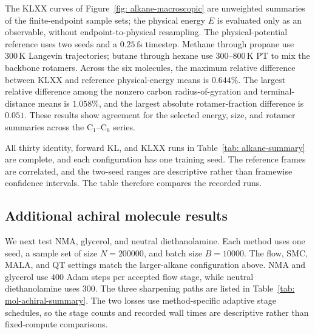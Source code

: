 \documentclass{article}
\begin{document}
The KLXX curves  of Figure~\ref{fig: alkane-macroscopic} are unweighted summaries of the finite-endpoint sample sets; the physical energy $E$ is evaluated only as an observable, without endpoint-to-physical resampling. The physical-potential reference uses two seeds and a $0.25\,\mathrm{fs}$ timestep. Methane through propane use $300\,\mathrm K$ Langevin trajectories; butane through hexane use $300$--$800\,\mathrm K$ PT to mix the backbone rotamers. Across the six molecules, the maximum relative difference between KLXX and reference physical-energy means is $0.644\%$. The largest relative difference among the nonzero carbon radius-of-gyration and terminal-distance means is $1.058\%$, and the largest absolute rotamer-fraction difference is $0.051$. These results show agreement for the selected energy, size, and rotamer summaries across the \(\mathrm C_1\)--\(\mathrm C_6\) series. 

All thirty identity, forward KL, and KLXX runs in Table~\ref{tab: alkane-summary} are complete, and each configuration has one training seed. The reference frames are correlated, and the two-seed ranges are descriptive rather than framewise confidence intervals. The table therefore compares the recorded runs.


\subsection{Additional achiral molecule results}
\label{sec: mol-achiral-results}

We next test NMA, glycerol, and neutral diethanolamine. Each method uses one seed, a sample set of size \(N=200000\), and batch size \(B=10000\). The flow, SMC, MALA, and QT settings match the larger-alkane configuration above. NMA and glycerol use \(400\) Adam steps per accepted flow stage, while neutral diethanolamine uses \(300\). The three sharpening paths are listed in Table~\ref{tab: mol-achiral-summary}. The two losses use method-specific adaptive stage schedules, so the stage counts and recorded wall times are descriptive rather than fixed-compute comparisons.
\end{document}
